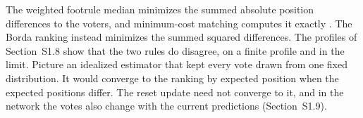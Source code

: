 The weighted footrule median minimizes the summed absolute position differences to the voters, and minimum-cost matching computes it exactly \citep{dwork2001rank}. The Borda ranking instead minimizes the summed squared differences. The profiles of Section~S1.8 show that the two rules do disagree, on a finite profile and in the limit. Picture an idealized estimator that kept every vote drawn from one fixed distribution. It would converge to the ranking by expected position when the expected positions differ. The reset update need not converge to it, and in the network the votes also change with the current predictions (Section~S1.9).
